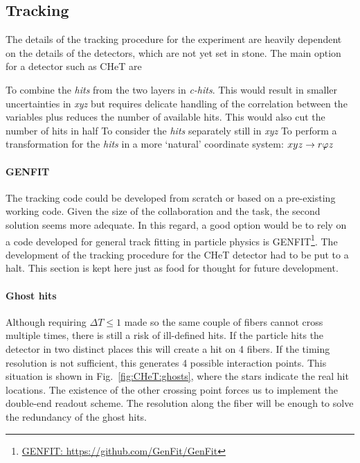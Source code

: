 \begin{refsection}
    \subsection{Tracking}
    The details of the tracking procedure for the experiment are heavily dependent on the details of the detectors, which are not yet set in stone.
    The main option for a detector such as CHeT are
    \begin{outline}
        \1 To combine the \textit{hits} from the two layers in \textit{c-hits}. This would result in smaller uncertainties in \textit{xyz} but requires delicate handling of the correlation between the variables plus reduces the number of available hits. This would also cut the number of hits in half
        \1 To consider the \textit{hits} separately still in \textit{xyz}
        \1 To perform a transformation for the \textit{hits} in a more `natural' coordinate system: $xyz\rightarrow r\varphi z$
    \end{outline}

        \paragraph{GENFIT}
        The tracking code could be developed from scratch or based on a pre-existing working code. 
        Given the size of the collaboration and the task, the second solution seems more adequate.
        In this regard, a good option would be to rely on a code developed for general track fitting in particle physics is GENFIT\footnote{\href{https://github.com/GenFit/GenFit}{GENFIT: https://github.com/GenFit/GenFit}}.
        The development of the tracking procedure for the CHeT detector had to be put to a halt. This section is kept here just as food for thought for future development.

        \paragraph{Ghost hits}
        Although requiring $\Delta T\leq1$ made so the same couple of fibers cannot cross multiple times, there is still a risk of ill-defined hits.
        If the particle hits the detector in two distinct places this will create a hit on 4 fibers. 
        If the timing resolution is not sufficient, this generates 4 possible interaction points.
        This situation is shown in Fig.~\ref{fig:CHeT:ghosts}, where the stars indicate the real hit locations.
        The existence of the other crossing point forces us to implement the double-end readout scheme.
        The resolution along the fiber will be enough to solve the redundancy of the ghost hits. 


\end{refsection}
